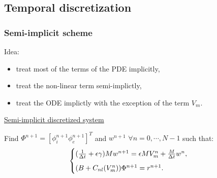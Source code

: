 \documentclass[9pt]{beamer}
\begin{document}
\begin{frame}
\section{Temporal discretization}
\frametitle{Semi-implicit scheme}
Idea:
\begin{itemize}
\item treat most of the terms of the PDE implicitly,
\item treat the non-linear term semi-implictly,
\item treat the ODE implictly with the exception of the term $V_m$.
\end{itemize}
\vspace{3mm}
\begin{center}
\underline{Semi-implicit discretized system}
\end{center}
Find $\Phi^{n+1}=[\phi_i^{n+1} \phi_e^{n+1}]^T$ and $w^{n+1}$ $\forall n=0,\cdots,N-1$ such that:
\begin{equation*}
\begin{cases}
(\frac{1}{\Delta t}+\epsilon \gamma)M w^{n+1}=\epsilon M V_m^n+\frac{M}{\Delta t} w^n, \vspace{2mm} \\
(B+C_{nl}(V_m^n)) \Phi^{n+1}=r^{n+1}.
\end{cases}
\end{equation*} 
\end{frame}
\end{document}
